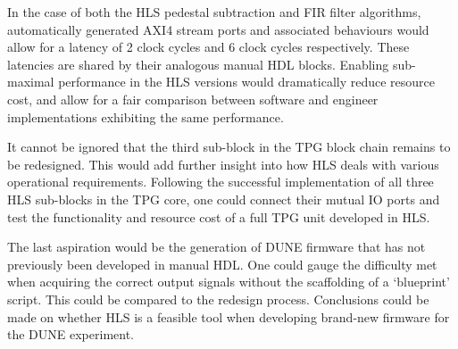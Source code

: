 \documentclass[10pt]{article}
\begin{document}
In the case of both the HLS pedestal subtraction and FIR filter algorithms, automatically generated AXI4 stream ports and associated behaviours would allow for a latency of 2 clock cycles and 6 clock cycles respectively. These latencies are shared by their analogous manual HDL blocks. Enabling sub-maximal performance in the HLS versions would dramatically reduce resource cost, and allow for a fair comparison between software and engineer implementations exhibiting the same performance.

It cannot be ignored that the third sub-block in the TPG block chain remains to be redesigned. This would add further insight into how HLS deals with various operational requirements. Following the successful implementation of all three HLS sub-blocks in the TPG core, one could connect their mutual IO ports and test the functionality and resource cost of a full TPG unit developed in HLS. 

The last aspiration would be the generation of DUNE firmware that has not previously been developed in manual HDL. One could gauge the difficulty met when acquiring the correct output signals without the scaffolding of a `blueprint' script. This could be compared to the redesign process. Conclusions could be made on whether HLS is a feasible tool when developing brand-new firmware for the DUNE experiment.

\newpage


\end{document}
